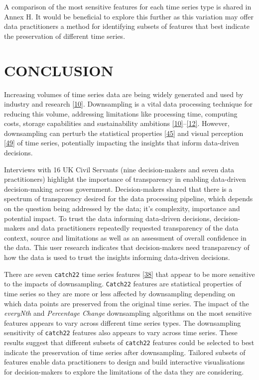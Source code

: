 \documentclass{article}
\begin{document}
A comparison of the most sensitive features for each time series type is
shared in Annex H. It would be beneficial to explore this further as
this variation may offer data practitioners a method for identifying
subsets of features that best indicate the preservation of different
time series.

\hypertarget{conclusion}{%
\section{CONCLUSION}\label{conclusion}}

Increasing volumes of time series data are being widely generated and
used by industry and research \protect\hyperlink{ref-TVStore}{{[}10{]}}.
Downsampling is a vital data processing technique for reducing this
volume, addressing limitations like processing time, computing costs,
storage capabilities and sustainability ambitions
\protect\hyperlink{ref-TVStore}{{[}10{]}}--\protect\hyperlink{ref-Shift}{{[}12{]}}.
However, downsampling can perturb the statistical properties
\protect\hyperlink{ref-ATIChangePoint}{{[}45{]}} and visual perception
\protect\hyperlink{ref-graphsampling}{{[}49{]}} of time series,
potentially impacting the insights that inform data-driven decisions.

Interviews with 16 UK Civil Servants (nine decision-makers and seven
data practitioners) highlight the importance of transparency in enabling
data-driven decision-making across government. Decision-makers shared
that there is a spectrum of transparency desired for the data processing
pipeline, which depends on the question being addressed by the data;
it's complexity, importance and potential impact. To trust the data
informing data-driven decisions, decision-makers and data practitioners
repeatedly requested transparency of the data context, source and
limitations as well as an assessment of overall confidence in the data.
This user research indicates that decision-makers need transparency of
how the data is used to trust the insights informing data-driven
decisions.

There are seven \texttt{catch22} time series features
\protect\hyperlink{ref-catch22}{{[}38{]}} that appear to be more
sensitive to the impacts of downsampling. \texttt{Catch22} features are
statistical properties of time series so they are more or less affected
by downsampling depending on which data points are preserved from the
original time series. The impact of the \emph{everyNth} and
\emph{Percentage Change} downsampling algorithms on the most sensitive
features appears to vary across different time series types. The
downsampling sensitivity of \texttt{catch22} features also appears to
vary across time series. These results suggest that different subsets of
\texttt{catch22} features could be selected to best indicate the
preservation of time series after downsampling. Tailored subsets of
features enable data practitioners to design and build interactive
visualisations for decision-makers to explore the limitations of the
data they are considering.
\end{document}
